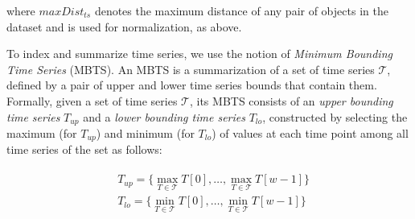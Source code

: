 \noindent where $maxDist_{ts}$ denotes the maximum distance of any pair of objects in the dataset and is used for normalization, as above.

To index and summarize time series, we use the notion of {\em Minimum Bounding Time Series} (MBTS). An MBTS is a summarization of a set of time series $\mathcal{T}$, defined by a pair of upper and lower time series bounds that contain them. Formally, given a set of time series $\mathcal{T}$, its MBTS consists of an \emph{upper bounding time series} $T_{up}$ and a \emph{lower bounding time series} $T_{lo}$, constructed by selecting the maximum (for $T_{up}$) and minimum (for $T_{lo}$) of values at each time point among all time series of the set as follows:

\begin{align}\label{eq:bounds1}
 \begin{split}
  & T_{up} = \{ \max_{T \in \mathcal{T}} T[0], \ldots, \max_{T \in \mathcal{T}} T[w-1] \} \\
  & T_{lo} = \{ \min_{T \in \mathcal{T}} T[0], \ldots, \min_{T \in \mathcal{T}} T[w-1] \}
 \end{split}
\end{align}










